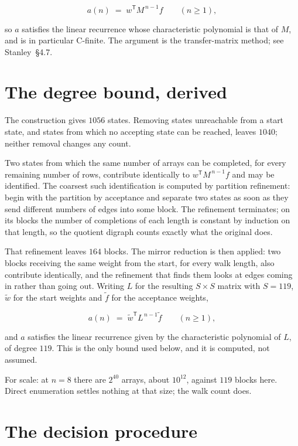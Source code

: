\documentclass[11pt]{article}
\theoremstyle{definition}
\begin{document}
\[a(n) \;=\; w^{\mathsf T} M^{\,n-1} f \qquad (n \ge 1),\]

so $a$ satisfies the linear recurrence whose characteristic polynomial is that of $M$, and is in particular C-finite. The argument is the transfer-matrix method; see Stanley~\S4.7.

\section{The degree bound, derived}

The construction gives $1056$ states. Removing states unreachable from a start state, and states from which no accepting state can be reached, leaves $1040$; neither removal changes any count.

Two states from which the same number of arrays can be completed, for every remaining number of rows, contribute identically to $w^{\mathsf T}M^{\,n-1}f$ and may be identified. The coarsest such identification is computed by partition refinement: begin with the partition by acceptance and separate two states as soon as they send different numbers of edges into some block. The refinement terminates; on its blocks the number of completions of each length is constant by induction on that length, so the quotient digraph counts exactly what the original does.

That refinement leaves $164$ blocks. The mirror reduction is then applied: two blocks receiving the same weight from the start, for every walk length, also contribute identically, and the refinement that finds them looks at edges coming in rather than going out. Writing $L$ for the resulting $S \times S$ matrix with $S = 119$, $\tilde w$ for the start weights and $\tilde f$ for the acceptance weights,

\[a(n) \;=\; \tilde w^{\mathsf T} L^{\,n-1} \tilde f \qquad (n \ge 1),\]

and $a$ satisfies the linear recurrence given by the characteristic polynomial of $L$, of degree $119$. This is the only bound used below, and it is computed, not assumed.

For scale: at $n = 8$ there are $2^{40}$ arrays, about $10^{12}$, against $119$ blocks here. Direct enumeration settles nothing at that size; the walk count does.

\section{The decision procedure}
\end{document}
